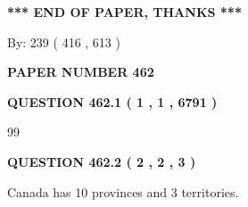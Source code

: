 \documentclass[12pt]{article}
\begin{document}
 
 
 
   
   
 \vspace{0.2in}
 
   
   
   
   
\vspace{1.0in} 
{\textbf{\large{ *** END OF PAPER, THANKS *** }}} 
   
   
\hspace{1.0in} By: 
 239 ( 416 ,  613 )
   
   
   
   
\newpage 
\setcounter{page}{ 
   462001 } 
   
   
   
   
 {\textbf{ \Large{ PAPER NUMBER  462  }}}
   
   
\vspace{0.2in}
   
   
   
   
   
   
 \vspace{0.2in}
 
 
 
 
   
   
  
\vspace{0.2in}
  
{\textbf{\Large{QUESTION
462.1 
 ( 1 , 1 , 6791 )
}}}
  
  
 
 
\noindent{}

99
 
 
  
\vspace{0.2in}
  
{\textbf{\Large{QUESTION
462.2 
 ( 2 , 2 , 3 )
}}}
  
  
 
 
\noindent{}
 
 
Canada has 10  provinces and 3 territories.
 
 
 
 
   
   
 \vspace{0.2in}
 
   
   
\end{document}
